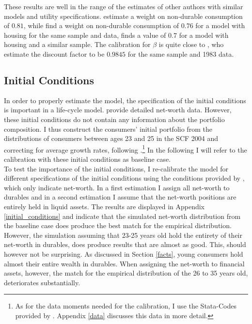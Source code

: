 \documentclass[a4paper,12pt,legno]{article}
\begin{document}
These results are well in the range of the estimates of other authors with similar models and utility specifications. \cite{FV&K2011} estimate a weight on non-durable consumption of $0.81$, while \cite{hintermaier2016} find a weight on non-durable consumption of $0.76$ for a model with housing for the same sample and data, \cite{gruber2003precautionary} finds a value of $0.7$ for a model with housing and a similar sample.
The calibration for $\beta$ is quite close to \cite{hintermaier2011}, who estimate the discount factor to be $0.9845$ for the same sample and 1983 data. 

\subsection{Initial Conditions}
In order to properly estimate the model, the specification of the initial conditions is important in a life-cycle model. \cite{hintermaier2011} provide detailed net-worth data. However, these initial conditions do not contain any information about the portfolio composition. I thus construct the consumers' initial portfolio from the distributions of consumers between ages 23 and 25 in the SCF 2004 and correcting for average growth rates, following \cite{hintermaier2011}.\footnote{As for the data moments needed for the calibration, I use the Stata-Codes provided by \cite{hintermaier2016}. Appendix \ref{data} discusses this data in more detail.} In the following I will refer to the calibration with these initial conditions as baseline case.\\
To test the importance of the initial conditions, I re-calibrate the model for different specifications of the initial conditions using the conditions provided by \cite{hintermaier2011}, which only indicate net-worth. In a first estimation I assign all net-worth to durables and in a second estimation I assume that the net-worth positions are entirely held in liquid assets. The results are displayed in Appendix \ref{initial_conditions} and indicate that the simulated net-worth distribution from the baseline case does produce the best match for the empirical distribution. However, the simulation assuming that 23-25 years old hold the entirety of their net-worth in durables, does produce results that are almost as good. This, should however not be surprising. As discussed in Section \ref{facts}, young consumers hold almost their entire wealth in durables. When assigning the net-worth to financial assets, however, the match for the empirical distribution of the 26 to 35 years old, deteriorates substantially.    
\end{document}
